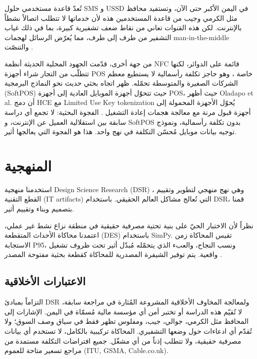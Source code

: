 \documentclass[12pt,a4paper]{article}
\begin{document}
تُعدّ قاعدة مستخدمي حلول SMS و USSD في اليمن الأكبر حتى الآن، وتستفيد محافظ مثل الكرمي وجيب من قاعدة المستخدمين هذه لأن خدماتها لا تتطلب اتصالاً نشطاً بالإنترنت. لكن هذه القنوات تعاني من نقاط ضعف تشفيرية كبيرة، بما في ذلك غياب التشفير من طرف إلى طرف، مما يُعرّض الرسائل لهجمات man-in-the-middle والتنصّت \cite{gsma2023}.

من جهة أخرى، قدّمت الجهود المحلية الحديثة أنظمة NFC قائمة على الدوائر، لكنها تتطلّب من التجار شراء أجهزة POS خاصة \cite{brandpos2024}، وهو حاجز تكلفة رأسمالية لا يستطيع معظم الشركات الصغيرة والمتوسطة تحمّله. ظهر اتجاه بحثي حديث نحو النماذج البرمجية (SoftPOS) حيث تتحوّل أجهزة الموبايل العادية إلى أجهزة POS، حيث أظهر Oladapo et al. أن دمج HCE مع Limited Use Key tokenization يُحوّل الأجهزة المحمولة إلى أجهزة قبول مرنة مع معالجة هجمات إعادة التشغيل \cite{oladapo2024}. الفجوة البحثية: لا تجمع أي دراسة سابقة بين استقلالية العميل عن الإنترنت، و SoftPOS بدون تكلفة رأسمالية، ونموذج توجيه بيانات موبايل مُحسّن التكلفة في نهج واحد. هذا هو الفجوة التي يعالجها أثير.

\section{المنهجية}
استخدمنا منهجية Design Science Research (DSR) \cite{hevner2004, peffers2007}، وهي نهج منهجي لتطوير وتقييم القطع التقنية (IT artifacts) التي تُعالج مشاكل العالم الحقيقي. باستخدام DSR، قمنا بتصميم وبناء وتقييم أثير.

نظراً لأن الاختبار الحيّ على بنية تحتية مصرفية حقيقية في منطقة نزاع نشط غير عملي، اعتمدنا محاكاة الأحداث المتقطعة (DES) باستخدام SimPy. تقيس المحاكاة زمن الاستجابة P95، ونسب النجاح، والعبء الذي يتحمّله مُبدّل أثير تحت ظروف تشغيل واقعية. يتم توفير الشيفرة المصدرية للمحاكاة كقطعة بحثية مفتوحة المصدر \cite{mutawakel2024}.

\subsection*{الاعتبارات الأخلاقية}
التزاماً بمبادئ DSR ولمعالجة المخاوف الأخلاقية المشروعة المُثارة في مراجعة سابقة، لا تُقيّم هذه الدراسة أو تختبر أمن أي مؤسسة مالية مُسمّاة في اليمن. الإشارات إلى المحافظ مثل الكرمي، جوالي، جيب، ومفلوس تظهر فقط في سياق وصف السوق؛ ولا تُقدّم أي ادعاءات حول وضعها التشفيري. المحاكاة تركيبية بالكامل، لا تستخدم أي بيانات مصرفية حقيقية، ولا تتطلب إذناً من أي مشغّل. جميع افتراضات التكلفة مستمدة من مراجع تسعير متاحة للعموم (ITU, GSMA, Cable.co.uk).
\end{document}
